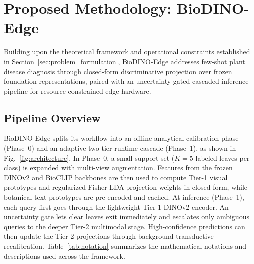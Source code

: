 \section{Proposed Methodology: BioDINO-Edge}
\label{sec:methodology}
Building upon the theoretical framework and operational constraints established in Section~\ref{sec:problem_formulation}, BioDINO-Edge addresses few-shot plant disease diagnosis through closed-form discriminative projection over frozen foundation representations, paired with an uncertainty-gated cascaded inference pipeline for resource-constrained edge hardware.

\subsection{Pipeline Overview}
\label{sec:system_architecture}
BioDINO-Edge splits its workflow into an offline analytical calibration phase (Phase~0) and an adaptive two-tier runtime cascade (Phase~1), as shown in Fig.~\ref{fig:architecture}. In Phase~0, a small support set ($K = 5$ labeled leaves per class) is expanded with multi-view augmentation. Features from the frozen DINOv2 and BioCLIP backbones are then used to compute Tier-1 visual prototypes and regularized Fisher-LDA projection weights in closed form, while botanical text prototypes are pre-encoded and cached. At inference (Phase~1), each query first goes through the lightweight Tier-1 DINOv2 encoder. An uncertainty gate lets clear leaves exit immediately and escalates only ambiguous queries to the deeper Tier-2 multimodal stage. High-confidence predictions can then update the Tier-2 projections through background transductive recalibration. Table~\ref{tab:notation} summarizes the mathematical notations and descriptions used across the framework.

